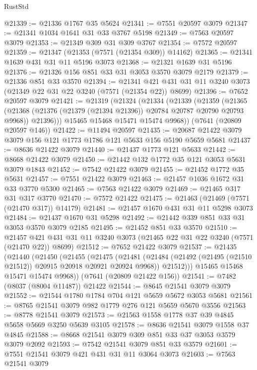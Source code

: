 \begin{lexlean}{RustStd}
\begin{coremodule}
{\begin{coremodule}
{{{{{{{{{{{{{{{{{{{{{{{{{{{{{{{{@21339 := @21336 @1767 @35 @5624
@21341 := @7551 @20597 @3079
@21347 := @21341 @1034 @1641 @31 @33 @3767 @5198
@21349 := @7563 @20597 @3079
@21353 := @21349 @309 @31 @309 @3767
@21354 := @7572 @20597
@21359 := @21347 (@21353 (@7571 (@21354 @309)) @14162)
@21365 := @21341 @1639 @431 @31 @11 @5196 @3073
@21368 := @21321 @1639 @31 @5196
@21376 := @21326 @156 @851 @33 @31 @3053 @3570 @3079 @2179
@21379 := @21336 @851 @33 @3570
@21394 := @21341 @421 @431 @31 @11 @3240 @3073 (@21349 @22 @31 @22 @3240 (@7571 (@21354 @22)) @8699)
@21396 := @7652 @20597 @3079
@21421 := @21319
    (@21324
      (@21334
        (@21339
          (@21359
            (@21365
              (@21368 (@21376 (@21379 (@21394 @21396)) @20784 @20787 @20790 @20793 @9968))
              @21396)))
        @15465
        @15468
        @15471
        @15474
        @9968))
    (@7641 (@20809 @20597 @146))
@21422 := @11494 @20597
@21435 := @20687 @21422 @3079 @3079 @156 @121 @1773 @1786 @121 @5633 @156 @5190 @5659 @5681
@21437 := @8636 @21422 @3079
@21440 := @21437 @1773 @121 @5633
@21442 := @8668 @21422 @3079
@21450 := @21442 @132 @1772 @35 @121 @3053 @5631 @3079 @1843
@21452 := @7542 @21422 @3079
@21455 := @21452 @1772 @35 @5631
@21457 := @7551 @21422 @3079
@21463 := @21457 @1036 @1672 @31 @33 @3770 @5300
@21465 := @7563 @21422 @3079
@21469 := @21465 @317 @31 @317 @3770
@21470 := @7572 @21422
@21475 := @21463 (@21469 (@7571 (@21470 @317)) @14179)
@21481 := @21457 @1670 @431 @31 @11 @5298 @3073
@21484 := @21437 @1670 @31 @5298
@21492 := @21442 @339 @851 @33 @31 @3053 @3570 @3079 @2185
@21495 := @21452 @851 @33 @3570
@21510 := @21457 @421 @431 @31 @11 @3240 @3073 (@21465 @22 @31 @22 @3240 (@7571 (@21470 @22)) @8699)
@21512 := @7652 @21422 @3079
@21537 := @21435
    (@21440
      (@21450
        (@21455
          (@21475
            (@21481
              (@21484 (@21492 (@21495 (@21510 @21512)) @20915 @20918 @20921 @20924 @9968))
              @21512)))
        @15465
        @15468
        @15471
        @15474
        @9968))
    (@7641 (@20809 @21422 @156))
@21541 := @7482 (@8037 (@8004 @11487)) @21422
@21544 := @8645 @21541 @3079 @3079
@21552 := @21544 @1780 @1784 @704 @121 @5659 @5672 @3053 @5681
@21561 := @8765 @21541 @3079 @982 @1779 @276 @121 @5659 @5670 @3556
@21563 := @8778 @21541 @3079
@21573 := @21563 @1558 @1778 @37 @39 @4845 @5658 @5669 @3250 @5639 @3105
@21578 := @8636 @21541 @3079 @1558 @37 @4845
@21588 := @8668 @21541 @3079 @309 @851 @33 @37 @3053 @3579 @3079 @2092
@21593 := @7542 @21541 @3079 @851 @33 @3579
@21601 := @7551 @21541 @3079 @421 @431 @31 @11 @3064 @3073
@21603 := @7563 @21541 @3079
}}}}}}}}}}}}}}}}}}}}}}}}}}}}}}}}
\end{coremodule}}
\end{coremodule}
\end{lexlean}
